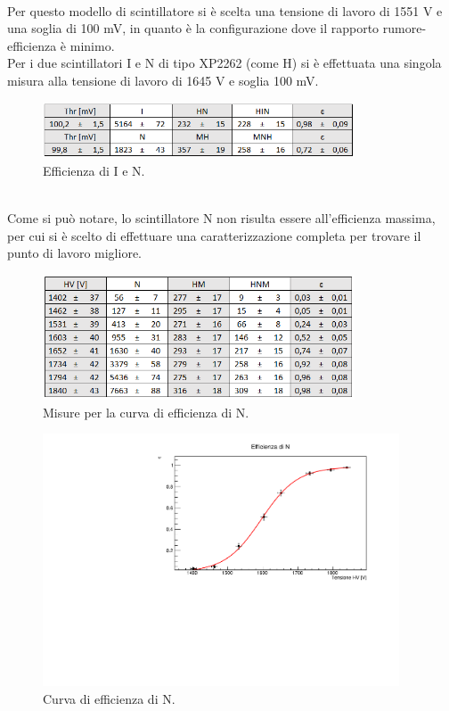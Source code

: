 \documentclass[11pt]{article} %
\begin{document}
\\Per questo modello di scintillatore si è scelta una tensione di lavoro di 1551 V e una soglia di 100 mV, in quanto è la configurazione dove il rapporto rumore-efficienza è minimo.\\
Per i due scintillatori I e N di tipo XP2262 (come H) si è effettuata una singola misura alla tensione di lavoro di 1645 V e soglia 100 mV.
 \begin{figure}[!h]
\begin{center}
\includegraphics[width=350px]{img/thres_IN.png}
\caption{Efficienza di I e N.}
\label{fig:thres_IN}
\end{center}
\end{figure}
\\Come si può notare, lo scintillatore N non risulta essere all'efficienza massima, per cui si è scelto di effettuare una caratterizzazione completa per trovare il punto di lavoro migliore.
\begin{figure}[h!]
\begin{center}
\includegraphics[width=350px]{img/table_N.png}
\caption{Misure per la curva di efficienza di N.}
\label{fig:table_N}
\end{center}
\end{figure}
\begin{figure}[!ht]
\begin{center}
\includegraphics[width=400px]{img/chart_N.pdf}
\caption{Curva di efficienza di N.}
\label{fig:chart_N}
\end{center}
\end{figure}
\end{document}

